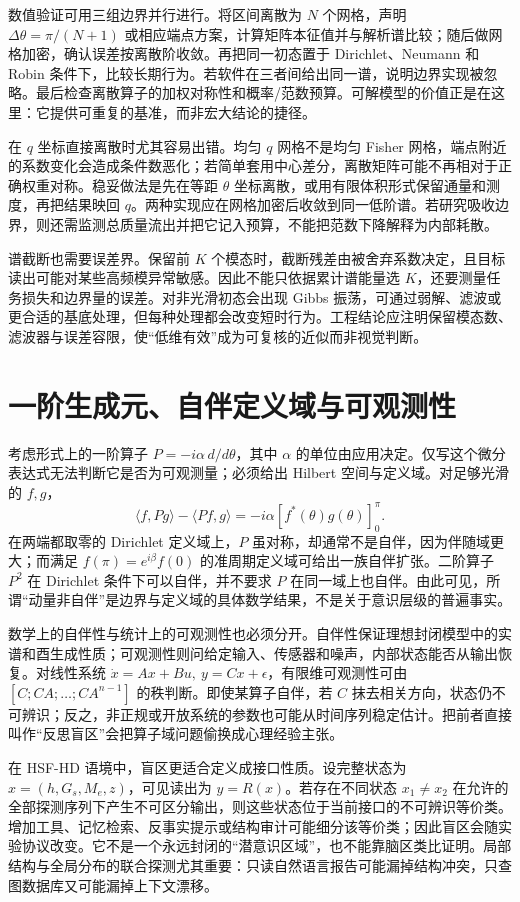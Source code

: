 数值验证可用三组边界并行进行。将区间离散为 $N$ 个网格，声明 $\Delta\theta=\pi/(N+1)$ 或相应端点方案，计算矩阵本征值并与解析谱比较；随后做网格加密，确认误差按离散阶收敛。再把同一初态置于 Dirichlet、Neumann 和 Robin 条件下，比较长期行为。若软件在三者间给出同一谱，说明边界实现被忽略。最后检查离散算子的加权对称性和概率/范数预算。可解模型的价值正是在这里：它提供可重复的基准，而非宏大结论的捷径。

在 $q$ 坐标直接离散时尤其容易出错。均匀 $q$ 网格不是均匀 Fisher 网格，端点附近的系数变化会造成条件数恶化；若简单套用中心差分，离散矩阵可能不再相对于正确权重对称。稳妥做法是先在等距 $\theta$ 坐标离散，或用有限体积形式保留通量和测度，再把结果映回 $q$。两种实现应在网格加密后收敛到同一低阶谱。若研究吸收边界，则还需监测总质量流出并把它记入预算，不能把范数下降解释为内部耗散。

谱截断也需要误差界。保留前 $K$ 个模态时，截断残差由被舍弃系数决定，且目标读出可能对某些高频模异常敏感。因此不能只依据累计谱能量选 $K$，还要测量任务损失和边界量的误差。对非光滑初态会出现 Gibbs 振荡，可通过弱解、滤波或更合适的基底处理，但每种处理都会改变短时行为。工程结论应注明保留模态数、滤波器与误差容限，使“低维有效”成为可复核的近似而非视觉判断。

\section{一阶生成元、自伴定义域与可观测性}
\label{sec:non_self_adjoint_momentum_blind_spot}

考虑形式上的一阶算子 $P=-i\alpha\,d/d\theta$，其中 $\alpha$ 的单位由应用决定。仅写这个微分表达式无法判断它是否为可观测量；必须给出 Hilbert 空间与定义域。对足够光滑的 $f,g$，
\[
\langle f,Pg\rangle-\langle Pf,g\rangle=-i\alpha[f^*(\theta)g(\theta)]_0^\pi .
\]
在两端都取零的 Dirichlet 定义域上，$P$ 虽对称，却通常不是自伴，因为伴随域更大；而满足 $f(\pi)=e^{i\beta}f(0)$ 的准周期定义域可给出一族自伴扩张。二阶算子 $P^2$ 在 Dirichlet 条件下可以自伴，并不要求 $P$ 在同一域上也自伴。由此可见，所谓“动量非自伴”是边界与定义域的具体数学结果，不是关于意识层级的普遍事实。

数学上的自伴性与统计上的可观测性也必须分开。自伴性保证理想封闭模型中的实谱和酉生成性质；可观测性则问给定输入、传感器和噪声，内部状态能否从输出恢复。对线性系统 $\dot x=Ax+Bu,\ y=Cx+\epsilon$，有限维可观测性可由 $[C;CA;\ldots;CA^{n-1}]$ 的秩判断。即使某算子自伴，若 $C$ 抹去相关方向，状态仍不可辨识；反之，非正规或开放系统的参数也可能从时间序列稳定估计。把前者直接叫作“反思盲区”会把算子域问题偷换成心理经验主张。

在 HSF-HD 语境中，盲区更适合定义成接口性质。设完整状态为 $x=(h,G_s,M_e,z)$，可见读出为 $y=R(x)$。若存在不同状态 $x_1\ne x_2$ 在允许的全部探测序列下产生不可区分输出，则这些状态位于当前接口的不可辨识等价类。增加工具、记忆检索、反事实提示或结构审计可能细分该等价类；因此盲区会随实验协议改变。它不是一个永远封闭的“潜意识区域”，也不能靠脑区类比证明。局部结构与全局分布的联合探测尤其重要：只读自然语言报告可能漏掉结构冲突，只查图数据库又可能漏掉上下文漂移。

